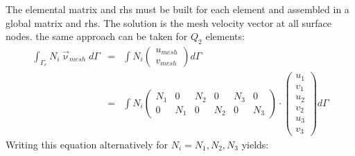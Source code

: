 The elemental matrix and rhs must be built for each element and assembled in a 
global matrix and rhs. The solution is the mesh velocity vector at all surface nodes.
the same approach can be taken for $Q_2$ elements:
\begin{eqnarray}
\int_{\Gamma_e} N_i \vec{\upnu}_{mesh} d\Gamma
&=& \int N_i \left( \begin{array}{c} u_{mesh} \\ v_{mesh} \end{array} \right) d\Gamma \\
&=& \int N_i 
\left( \begin{array}{cccccc}  
N_1 & 0 & N_2 & 0 & N_3 & 0\\ 
0 & N_1 & 0 & N_2 & 0 & N_3 
\end{array}\right)\cdot
\left( \begin{array}{c} u_1 \\ v_1 \\ u_2 \\ v_2 \\ u_3 \\ v_3 \end{array} \right) d\Gamma 
\end{eqnarray}
Writing this equation alternatively for $N_i=N_1,N_2,N_3$ yields:
